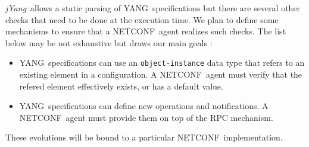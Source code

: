 \documentclass[a4paper]{article}
\newcommand{\jyang}{{\sl jYang}}
\newcommand{\nc}{NETCONF}
\newcommand{\y}{YANG}
\begin{document}
\jyang\ allows  a static parsing  of \y\ specifications but  there are
several other  checks that need to  be done at the  execution time. We
plan to  define some mechanisms to  ensure that a  \nc\ agent realizes
such checks.  The list below may  be not exhaustive but draws our main
goals :
\begin{itemize}
\item
\y\  specifications can  use an  {\tt object-instance}  data  type that
refers to  an existing element in  a configuration. A  \nc\ agent must
verify  that the refered  element  effectively exists,  or  has a  default
value.
\item
\y\ specifications can define new operations and notifications. A \nc\
agent must provide them on top of the RPC mechanism.
\end{itemize}

These evolutions will be bound to a particular \nc\ implementation.



\end{document}
